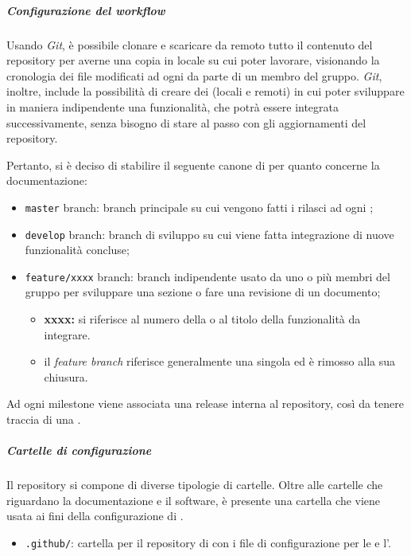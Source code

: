 		\subparagraph{Configurazione del workflow}

		Usando \textit{Git}, è possibile clonare e scaricare da remoto tutto il contenuto del repository per averne una copia in locale su cui poter lavorare, visionando la cronologia dei file modificati ad ogni  da parte di un membro del gruppo.
		\newline
		\textit{Git}, inoltre, include la possibilità di creare dei  (locali e remoti) in cui poter sviluppare in maniera indipendente una funzionalità, che potrà essere integrata successivamente, senza bisogno di stare al passo con gli aggiornamenti del repository.

		Pertanto, si è deciso di stabilire il seguente canone di  per quanto concerne la documentazione:
		\begin{itemize}
			\item \verb!master! branch: branch principale su cui vengono fatti i rilasci ad ogni ;
			\item \verb!develop! branch: branch di sviluppo su cui viene fatta integrazione di nuove funzionalità concluse;
			\item \verb!feature/xxxx! branch: branch indipendente usato da uno o più membri del gruppo per sviluppare una sezione o fare una revisione di un documento;
			\begin{itemize}
				\item \textbf{xxxx:} si riferisce al numero della  o al titolo della funzionalità da integrare.
				\item il \textit{feature branch} riferisce generalmente una singola  ed è rimosso alla sua chiusura.
			\end{itemize}
		\end{itemize}

		Ad ogni milestone viene associata una release interna al repository, così da tenere traccia di una .

		\subparagraph{Cartelle di configurazione}

		Il repository si compone di diverse tipologie di cartelle. Oltre alle cartelle che riguardano la documentazione e il software, è presente una cartella che viene usata ai fini della configurazione di .
		\begin{itemize}
			\item \verb!.github/!: cartella per il repository di  con i file di configurazione per le  e l'.
		\end{itemize}

